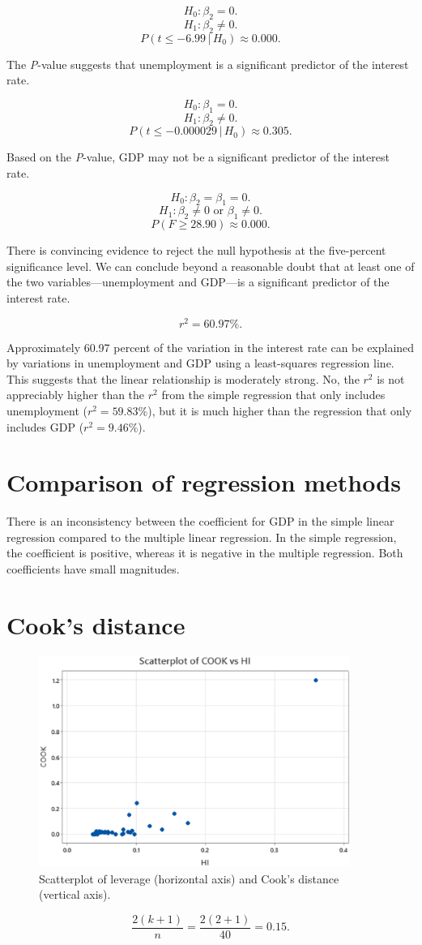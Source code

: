 \documentclass[12pt]{article}
\begin{document}
\[H_0:\beta_2=0.\]
\[H_1:\beta_2\neq 0.\]
\[P(t\leq -6.99\,|\,H_0)\approx 0.000.\]

The \textit{P}-value suggests that unemployment is a significant predictor of the interest rate.

\[H_0:\beta_1=0.\]
\[H_1:\beta_2\neq 0.\]
\[P(t\leq -0.000029\,|\,H_0)\approx 0.305.\]

Based on the \textit{P}-value, GDP may not be a significant predictor of the interest rate.

\[H_0:\beta_2=\beta_1=0.\]
\[H_1:\beta_2\neq 0\text{ or }\beta_1\neq 0.\]
\[P(F\geq 28.90)\approx 0.000.\]

There is convincing evidence to reject the null hypothesis at the five-percent significance level. We can conclude beyond a reasonable doubt that at least one of the two variables---unemployment and GDP---is a significant predictor of the interest rate.

\[r^2=60.97\%.\]

Approximately 60.97 percent of the variation in the interest rate can be explained by variations in unemployment and GDP using a least-squares regression line. This suggests that the linear relationship is moderately strong. No, the $r^2$ is not appreciably higher than the $r^2$ from the simple regression that only includes unemployment ($r^2=59.83\%$), but it is much higher than the regression that only includes GDP ($r^2=9.46\%$).
\section{Comparison of regression methods}
There is an inconsistency between the coefficient for GDP in the simple linear regression compared to the multiple linear regression. In the simple regression, the coefficient is positive, whereas it is negative in the multiple regression. Both coefficients have small magnitudes. 
\section{Cook's distance}
\begin{figure}[h]
\begin{center}
\includegraphics[width=4in]{images/leverage-cook-scatterplot.png}
\end{center}
\caption{Scatterplot of leverage (horizontal axis) and Cook's distance (vertical axis). \label{fig:leveragecookscatterplot}}
\end{figure}
\[\frac{2(k+1)}{n}=\frac{2(2+1)}{40}=0.15.\]
\end{document}
